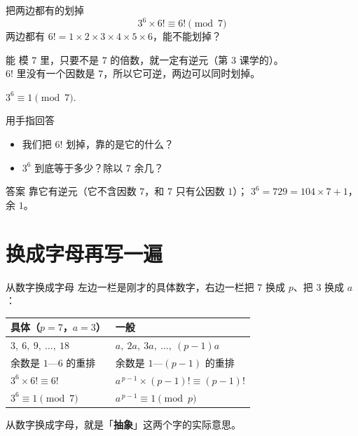 \documentclass[10pt]{beamer}
\begin{document}
\begin{frame}{把两边都有的划掉}
  \[
    3^{6}\times6!\equiv 6! \pmod 7
  \]
  \pause
  两边都有 \(6!=1\times2\times3\times4\times5\times6\)，能不能划掉？
  \pause
  \begin{block}{能}
    模 \(7\) 里，只要不是 \(7\) 的倍数，就一定有逆元（第 3 课学的）。\\
    \(6!\) 里没有一个因数是 \(7\)，所以它可逆，两边可以同时划掉。
  \end{block}
  \pause
  \begin{center}
    {\Large \(3^{6}\equiv 1 \pmod 7\).}
  \end{center}
\end{frame}

\begin{frame}{用手指回答}
  \begin{itemize}
    \item 我们把 \(6!\) 划掉，靠的是它的什么？
    \item \(3^6\) 到底等于多少？除以 \(7\) 余几？
  \end{itemize}
  \pause
  \begin{block}{答案}
    靠它有逆元（它不含因数 \(7\)，和 \(7\) 只有公因数 \(1\)）；\quad
    \(3^6=729=104\times7+1\)，余 \(1\)。
  \end{block}
\end{frame}

\section{换成字母再写一遍}

\begin{frame}{从数字换成字母}
  左边一栏是刚才的具体数字，右边一栏把 \(7\) 换成 \(p\)、把 \(3\) 换成 \(a\)：
  \begin{center}
  \begin{tabular}{@{}ll@{}}
    \toprule
    \textbf{具体}（\(p=7\)，\(a=3\)） & \textbf{一般} \\
    \midrule
    \(3,\ 6,\ 9,\ \dots,\ 18\) & \(a,\ 2a,\ 3a,\ \dots,\ (p-1)a\) \\
    余数是 \(1\text{—}6\) 的重排 & 余数是 \(1\text{—}(p-1)\) 的重排 \\
    \(3^{6}\times6!\equiv6!\) & \(a^{\,p-1}\times(p-1)!\equiv(p-1)!\) \\
    \(3^{6}\equiv1 \pmod 7\) & \(a^{\,p-1}\equiv1 \pmod p\) \\
    \bottomrule
  \end{tabular}
  \end{center}
  \pause
  \begin{center}
    {\large 从数字换成字母，就是「\textbf{抽象}」这两个字的实际意思。}
  \end{center}
\end{frame}
\end{document}
